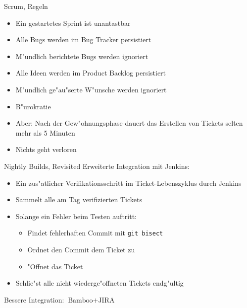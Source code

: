 \documentclass{beamer}
\newcommand{\cmark}{\ding{51}}
\newcommand{\xmark}{\ding{55}}
\begin{document}
\begin{frame}{Scrum, Regeln}
	\begin{itemize}
		\item Ein gestartetes Sprint ist unantastbar
		\item Alle Bugs werden im Bug Tracker persistiert
		\item M"undlich berichtete Bugs werden ignoriert
		\item Alle Ideen werden im Product Backlog persistiert
		\item M"undlich ge"au"serte W"unsche werden ignoriert
		\item B"urokratie \xmark
		\item Aber: Nach der Gew"ohnungsphase dauert das Erstellen von Tickets selten mehr als 5 Minuten
		\item Nichts geht verloren \cmark
	\end{itemize}
\end{frame}

\begin{frame}{Nightly Builds, Revisited}
	Erweiterte Integration mit Jenkins:
	\begin{itemize}
		\item Ein zus"atlicher Verifikationsschritt im Ticket-Lebenszyklus durch Jenkins
		\item Sammelt alle am Tag verifizierten Tickets
		\item Solange ein Fehler beim Testen auftritt:
			\begin{itemize}
				\item Findet fehlerhaften Commit mit \texttt{git bisect}
				\item Ordnet den Commit dem Ticket zu
				\item "Offnet das Ticket
			\end{itemize}
		\item Schlie"st alle nicht wiederge"offneten Tickets endg"ultig
	\end{itemize}
	Bessere Integration: $\text{Bamboo} + \text{JIRA}$
\end{frame}
\end{document}
